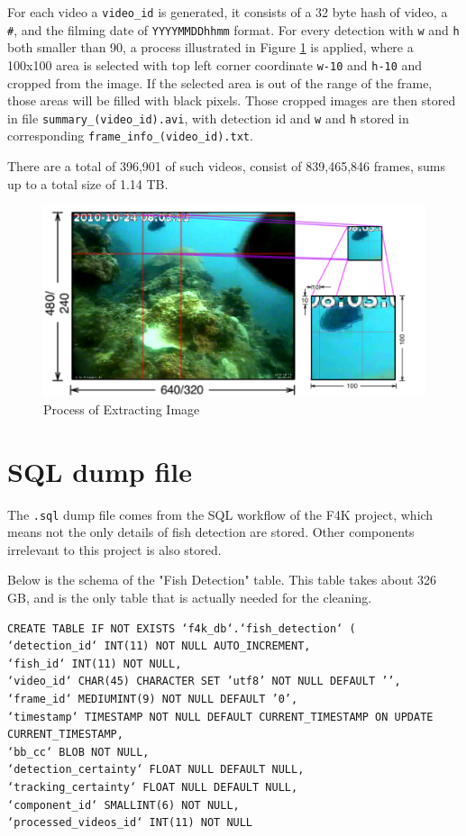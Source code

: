 \documentclass[bsc,logo,twoside,fullspacing,parskip]{infthesis}
\begin{document}
For each video a {\tt video\_id} is generated, it consists of a 32 byte hash of video, a {\tt \#}, and the filming date of {\tt YYYYMMDDhhmm} format. 
For every detection with {\tt w} and {\tt h} both smaller than 90, a process illustrated in Figure \ref{fig:extraction} is applied, where a 100x100 area is selected with top left corner coordinate {\tt w-10} and {\tt h-10} and cropped from the image. 
If the selected area is out of the range of the frame, those areas will be filled with black pixels.
Those cropped images are then stored in file {\tt summary\_(video\_id).avi}, with detection id and {\tt w} and {\tt h} stored in corresponding {\tt frame\_info\_(video\_id).txt}.

There are a total of 396,901 of such videos, consist of 839,465,846 frames, sums up to a total size of 1.14 TB.

\begin{figure}
    \centering
    \includegraphics[scale=0.3]{graph/extraction.png}
    \caption{Process of Extracting Image}
    \label{fig:extraction}
\end{figure}

\section{SQL dump file}
\label{sec:sqld}

The {\tt .sql} dump file comes from the SQL workflow of the F4K project, which means not the only details of fish detection are stored. 
Other components irrelevant to this project is also stored. 

Below is the schema of the "Fish Detection" table. 
This table takes about 326 GB, and is the only table that is actually needed for the cleaning.

\lstset{basicstyle=\tiny\ttfamily,breaklines=true,style=sql}
\begin{lstlisting}[frame=single]
CREATE TABLE IF NOT EXISTS ‘f4k_db‘.‘fish_detection‘ (
‘detection_id‘ INT(11) NOT NULL AUTO_INCREMENT,
‘fish_id‘ INT(11) NOT NULL,
‘video_id‘ CHAR(45) CHARACTER SET ’utf8’ NOT NULL DEFAULT ’’,
‘frame_id‘ MEDIUMINT(9) NOT NULL DEFAULT ’0’,
‘timestamp‘ TIMESTAMP NOT NULL DEFAULT CURRENT_TIMESTAMP ON UPDATE CURRENT_TIMESTAMP,
‘bb_cc‘ BLOB NOT NULL,
‘detection_certainty‘ FLOAT NULL DEFAULT NULL,
‘tracking_certainty‘ FLOAT NULL DEFAULT NULL,
‘component_id‘ SMALLINT(6) NOT NULL,
‘processed_videos_id‘ INT(11) NOT NULL
\end{lstlisting}
\end{document}
